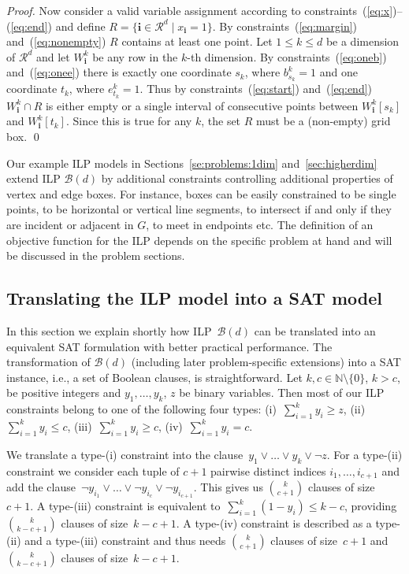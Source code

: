 \documentclass[runningheads]{llncs}
\newcommand{\bvec}[1]{\mathbf{#1}}
\newcounter{constr}
\begin{document}
\begin{proof}
Now consider a valid variable assignment according to
constraints~(\ref{eq:x})--(\ref{eq:end}) and define $R= \{\bvec{i} \in
\mathcal R^d \mid x_\bvec{i} = 1\}$. By constraints~(\ref{eq:margin})
and~(\ref{eq:nonempty}) $R$ contains at least one point. Let $1\le
k\le d$ be a dimension of $\mathcal R^d$ and let $W_\bvec{i}^k$ be any
row in the $k$-th dimension. By constraints~(\ref{eq:oneb})
and~(\ref{eq:onee}) there is exactly one coordinate $s_k$, where
$b_{s_k}^k=1$ and one coordinate $t_k$, where $e_{t_k}^k=1$. Thus by
constraints~(\ref{eq:start}) and~(\ref{eq:end}) $W_\bvec{i}^k \cap R$
is either empty or a single interval of consecutive points between
$W_\bvec{i}^k[s_k]$ and $W_\bvec{i}^k[t_k]$. Since this is true for
any $k$, the set $R$ must be a (non-empty) grid box. \qed
\end{proof}


Our example ILP models in Sections~\ref{se:problems:1dim}
and~\ref{sec:higherdim} extend ILP $\mathcal B(d)$ by additional
constraints controlling additional properties of vertex and edge
boxes. For instance, boxes can be easily constrained to be single
points, to be horizontal or vertical line segments, to intersect if
and only if they are incident or adjacent in $G$, to meet in endpoints
etc.
The definition of an objective function for the ILP depends on the
specific problem at hand and will be discussed in the problem
sections.
\subsection{Translating the ILP model into a SAT
model}\label{sec:satmodel}
In this section we explain shortly how ILP~$\mathcal B(d)$ can be
translated into an equivalent SAT formulation with better
practical performance. The transformation of $\mathcal B(d)$
(including later problem-specific extensions) into a SAT instance,
i.e., a set of Boolean clauses, is straightforward. Let $k,c \in
\mathbb N \setminus \{ 0 \}$, $k > c$, be positive integers and $y_1,
\ldots, y_k$, $z$ be binary variables. Then most of our ILP
constraints belong to one of the following four types:
(i)~$\sum_{i=1}^k y_i \geq z$, 
(ii)~\mbox{$\sum_{i=1}^k y_i \leq c$,} 
(iii)~$\sum_{i=1}^k y_i \geq c$,
(iv)~$\sum_{i=1}^k y_i = c$. 

We translate a type-(i) constraint
into the clause~$y_1 \vee \ldots \vee y_k \vee \neg z$.
For a type-(ii) constraint we consider each tuple of $c+1$ pairwise
distinct indices $i_1, \ldots, i_{c+1}$ and
 add the clause~$\neg y_{i_1} \vee \ldots \vee \neg y_{i_c} \vee \neg
y_{i_{c+1}}$. 
This gives us $\binom{k}{c+1}$ clauses of size~$c+1$.
A \mbox{type-(iii)} constraint is equivalent to~$\sum_{i=1}^k (1 -
y_i) \leq k-c$,
providing $\binom{k}{k-c+1}$ clauses of size~$k-c+1$.
A type-(iv) constraint 
is described as a type-(ii) and a type-(iii) constraint and thus needs
$\binom{k}{c+1}$ clauses of size~$c+1$
and $\binom{k}{k-c+1}$ clauses of size~$k-c+1$. 
\end{document}

